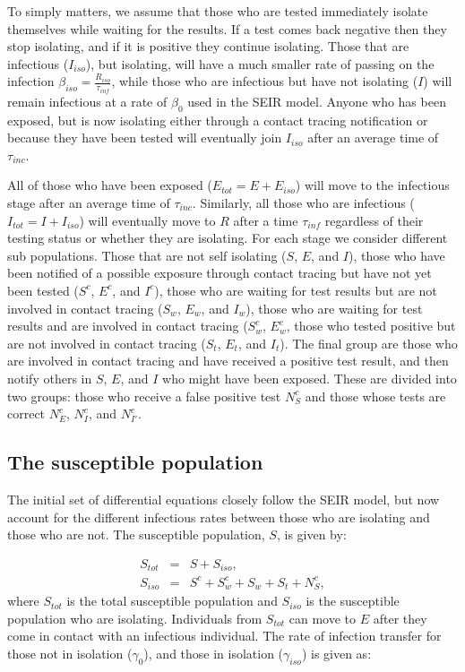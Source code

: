 \documentclass[notitlepage, superscriptaddress]{revtex4-2}
\begin{document}
To simply matters, we assume that those who are tested immediately isolate themselves while waiting for the results. If a test comes back negative then they stop isolating, and if it is positive they continue isolating. Those that are infectious ($I_{iso}$), but isolating, will have a much smaller rate of passing on the infection $\beta_{iso} = \frac{R_{iso}}{\tau_{inf}}$, while those who are infectious but have not isolating ($I$) will remain infectious at a rate of $\beta_{0}$ used in the SEIR model. Anyone who has been exposed, but is now isolating either through a contact tracing notification or because they have been tested will eventually join $I_{iso}$ after an average time of $\tau_{inc}$. 

All of those who have been exposed ($E_{tot} = E + E_{iso}$) will move to the infectious stage after an average time of $\tau_{inc}$. Similarly, all those who are infectious ($I_{tot} =  I + I_{iso}$) will eventually move to $R$ after a time $\tau_{inf}$ regardless of their testing status or whether they are isolating. For each stage we consider different sub populations. Those that are not self isolating ($S$, $E$, and $I$), those who have been notified of a possible exposure through contact tracing but have not yet been tested ($S^{c}$, $E^{c}$, and $I^{c}$), those who are waiting for test results but are not involved in contact tracing ($S_{w}$, $E_{w}$, and $I_{w}$), those who are waiting for test results and are involved in contact tracing ($S^{c}_{w}$, $E^{c}_{w}$, those who tested positive but are not involved in contact tracing ($S_{t}$, $E_{t}$, and $I_{t}$). The final group are those who are involved in contact tracing and have received a positive test result, and then notify others in $S$, $E$, and $I$ who might have been exposed. These are divided into two groups: those who receive a false positive test $N^{c}_{S}$ and those whose tests are correct $N^{c}_{E}$, $N^{c}_{I}$, and $N^{c}_{I'}$.

\subsection{The susceptible population}

The initial set of differential equations closely follow the SEIR model, but now account for the different infectious rates between those who are isolating and those who are not. The susceptible population, $S$, is given by:

\begin{eqnarray}
\label{E:Stot}
S_{tot} &=& S + S_{iso}, \\
% 
S_{iso} &=& S^{c} + S^{c}_{w} + S_{w} + S_{t} + N^{c}_{S},
\end{eqnarray}
where $S_{tot}$ is the total susceptible population and $S_{iso}$ is the susceptible population who are isolating. Individuals from $S_{tot}$ can move to $E$ after they come in contact with an infectious individual. The rate of infection transfer for those not in isolation ($\gamma_{0}$), and those in isolation ($\gamma_{iso}$) is given as:
\end{document}

